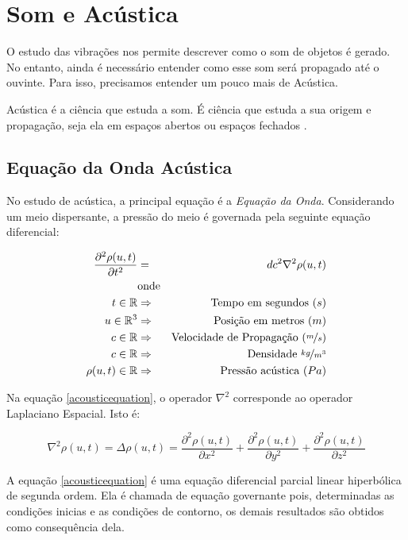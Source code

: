 \section{Som e Acústica}

O estudo das vibrações nos permite descrever como o som de objetos é gerado. No entanto, ainda é necessário entender como esse som será propagado até o ouvinte. Para isso, precisamos entender um pouco mais de Acústica.

Acústica é a ciência que estuda a som. É ciência que estuda a sua origem e propagação, seja ela em espaços abertos ou espaços fechados \cite{kuttruff2007acoustics}.

\subsection{Equação da Onda Acústica}

No estudo de acústica, a principal equação é a \emph{Equação da Onda}. Considerando um meio dispersante, a pressão do meio é governada pela seguinte equação diferencial:

\begin{eqnarray}
\frac{\partial^2 \rho(u, t)}{\partial t^2} &=& dc^2 \nabla^2 \rho(u, t)\label{acousticequation} \\
&\text{onde}&\nonumber\\
t \in \mathbb{R} &\Rightarrow& \text{Tempo em segundos }(s) \nonumber\\
u \in \mathbb{R}^3 &\Rightarrow& \text{Posição em metros }(m) \nonumber\\
c \in \mathbb{R} &\Rightarrow& \text{Velocidade de Propagação }(\nicefrac{m}{s}) \nonumber\\
c \in \mathbb{R} &\Rightarrow& \text{Densidade } \nicefrac{kg}{m^3} \nonumber\\
\rho(u, t) \in \mathbb{R} &\Rightarrow& \text{Pressão acústica }(Pa) \nonumber
\end{eqnarray}

Na equação \eqref{acousticequation}, o operador $\nabla^2$ corresponde ao operador Laplaciano Espacial. Isto é:

\begin{equation}
	\nabla^2 \rho(u, t) = \Delta \rho(u, t) = \frac{\partial^2 \rho(u, t)}{\partial x^2} + \frac{\partial^2 \rho(u, t)}{\partial y^2} + \frac{\partial^2 \rho(u, t)}{\partial z^2}
\end{equation}

A equação \eqref{acousticequation} é uma equação diferencial parcial linear hiperbólica de segunda ordem. Ela é chamada de equação governante pois, determinadas as condições inicias e as condições de contorno, os demais resultados são obtidos como consequência dela.

